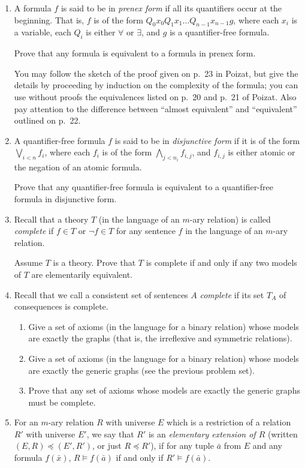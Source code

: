 \documentclass{amsart}
\theoremstyle{definition}
\newcommand{\ba}{\bar{a}}
\newcommand{\bx}{\bar{x}}
\begin{document}
\begin{enumerate}
\item A formula $f$ is said to be in \emph{prenex form} if all its quantifiers occur at the beginning. That is, $f$ is of the form $Q_0 x_0 Q_1 x_1 \ldots Q_{n - 1} x_{n - 1} g$, where each $x_i$ is a variable, each $Q_i$ is either $\forall$ or $\exists$, and $g$ is a quantifier-free formula.

  Prove that any formula is equivalent to a formula in prenex form.

  You may follow the sketch of the proof given on p.~23 in Poizat, but give the details by proceeding by induction on the complexity of the formula; you can use without proofs the equivalences listed on p.~20 and p.~21 of Poizat. Also pay attention to the difference between ``almost equivalent'' and ``equivalent'' outlined on p.~22.
\item A quantifier-free formula $f$ is said to be in \emph{disjunctive form} if it is of the form $\bigvee_{i < n} f_i$, where each $f_i$ is of the form $\bigwedge_{j < n_i} f_{i, j}$, and $f_{i, j}$ is either atomic or the negation of an atomic formula.

  Prove that any quantifier-free formula is equivalent to a quantifier-free formula in disjunctive form.

\item Recall that a theory $T$ (in the language of an $m$-ary relation) is called \emph{complete} if $f \in T$ or $\neg f \in T$ for any sentence $f$ in the language of an $m$-ary relation.

  Assume $T$ is a theory. Prove that $T$ is complete if and only if any two models of $T$ are elementarily equivalent.

\item Recall that we call a consistent set of sentences $A$ \emph{complete} if its set $T_A$ of consequences is complete.

  \begin{enumerate}
  \item Give a set of axioms (in the language for a binary relation) whose models are exactly the  graphs (that is, the irreflexive and symmetric relations).
  \item Give a set of axioms (in the language for a binary relation) whose models are exactly the generic graphs (see the previous problem set).
  \item Prove that any set of axioms whose models are exactly the generic graphs must be complete.
  \end{enumerate}
\item For an $m$-ary relation $R$ with universe $E$ which is a restriction of a relation $R'$ with universe $E'$, we say that $R'$ is an \emph{elementary extension of $R$} (written $(E, R) \preceq (E', R')$, or just $R \preceq R'$), if for any tuple $\ba$ from $E$ and any formula $f (\bx)$, $R \models f (\ba)$ if and only if $R' \models f (\ba)$.


\end{enumerate}
\end{document}
